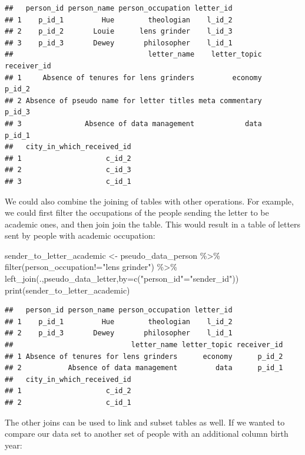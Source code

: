 \documentclass[
]{book}
\newenvironment{Shaded}{\begin{snugshade}}{\end{snugshade}}
\newcommand{\AttributeTok}[1]{\textcolor[rgb]{0.77,0.63,0.00}{#1}}
\newcommand{\FunctionTok}[1]{\textcolor[rgb]{0.00,0.00,0.00}{#1}}
\newcommand{\NormalTok}[1]{#1}
\newcommand{\OtherTok}[1]{\textcolor[rgb]{0.56,0.35,0.01}{#1}}
\newcommand{\SpecialCharTok}[1]{\textcolor[rgb]{0.00,0.00,0.00}{#1}}
\newcommand{\StringTok}[1]{\textcolor[rgb]{0.31,0.60,0.02}{#1}}
\begin{document}
\begin{verbatim}
##   person_id person_name person_occupation letter_id
## 1    p_id_1         Hue        theologian    l_id_2
## 2    p_id_2       Louie      lens grinder    l_id_3
## 3    p_id_3       Dewey       philosopher    l_id_1
##                                letter_name    letter_topic receiver_id
## 1     Absence of tenures for lens grinders         economy      p_id_2
## 2 Absence of pseudo name for letter titles meta commentary      p_id_3
## 3               Absence of data management            data      p_id_1
##   city_in_which_received_id
## 1                    c_id_2
## 2                    c_id_3
## 3                    c_id_1
\end{verbatim}

We could also combine the joining of tables with other operations. For example, we could first filter the occupations of the people sending the letter to be academic ones, and then join join the table. This would result in a table of letters sent by people with academic occupation:

\begin{Shaded}
\begin{Highlighting}[]
\NormalTok{sender\_to\_letter\_academic }\OtherTok{\textless{}{-}}\NormalTok{ pseudo\_data\_person }\SpecialCharTok{\%\textgreater{}\%} \FunctionTok{filter}\NormalTok{(person\_occupation}\SpecialCharTok{!=}\StringTok{"lens grinder"}\NormalTok{) }\SpecialCharTok{\%\textgreater{}\%} \FunctionTok{left\_join}\NormalTok{(.,pseudo\_data\_letter,}\AttributeTok{by=}\FunctionTok{c}\NormalTok{(}\StringTok{"person\_id"}\OtherTok{=}\StringTok{"sender\_id"}\NormalTok{))}
\FunctionTok{print}\NormalTok{(sender\_to\_letter\_academic)}
\end{Highlighting}
\end{Shaded}

\begin{verbatim}
##   person_id person_name person_occupation letter_id
## 1    p_id_1         Hue        theologian    l_id_2
## 2    p_id_3       Dewey       philosopher    l_id_1
##                            letter_name letter_topic receiver_id
## 1 Absence of tenures for lens grinders      economy      p_id_2
## 2           Absence of data management         data      p_id_1
##   city_in_which_received_id
## 1                    c_id_2
## 2                    c_id_1
\end{verbatim}

The other joins can be used to link and subset tables as well. If we wanted to compare our data set to another set of people with an additional column birth year:
\end{document}
